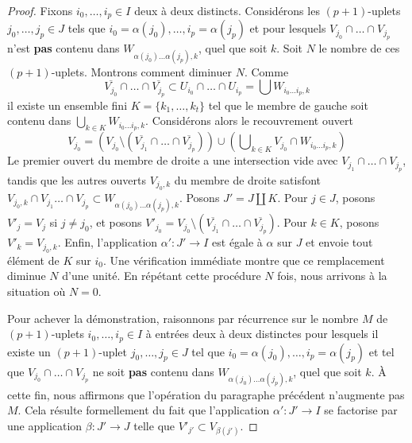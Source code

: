\begin{proof}
\medskip\noindent
Fixons $i_0, \ldots, i_p \in I$ deux à deux distincts. Considérons les
$(p + 1)$-uplets $j_0, \ldots, j_p \in J$ tels que
$i_0 = \alpha(j_0), \ldots, i_p = \alpha(j_p)$ et pour lesquels
$V_{j_0} \cap \ldots \cap V_{j_p}$ n'est {\bf pas} contenu dans
$W_{\alpha(j_0) \ldots \alpha(j_p), k}$, quel que soit $k$.
Soit $N$ le nombre de ces $(p + 1)$-uplets. Montrons comment diminuer $N$.
Comme
$$
\overline{V_{j_0}} \cap \ldots \cap \overline{V_{j_p}} \subset
U_{i_0} \cap \ldots \cap U_{i_p} = \bigcup W_{i_0 \ldots i_p, k}
$$
il existe un ensemble fini $K = \{k_1, \ldots, k_t\}$ tel que le membre de
gauche soit contenu dans $\bigcup_{k \in K} W_{i_0 \ldots i_p, k}$.
Considérons alors le recouvrement ouvert
$$
V_{j_0} =
(V_{j_0} \setminus (\overline{V_{j_1}} \cap \ldots \cap \overline{V_{j_p}}))
\cup (\bigcup\nolimits_{k \in K} V_{j_0} \cap W_{i_0 \ldots i_p, k})
$$
Le premier ouvert du membre de droite a une intersection vide avec
$V_{j_1} \cap \ldots \cap V_{j_p}$, tandis que les
autres ouverts $V_{j_0, k}$ du membre de droite satisfont
$V_{j_0, k} \cap V_{j_1} \ldots \cap V_{j_p} \subset
W_{\alpha(j_0) \ldots \alpha(j_p), k}$.
Posons $J' = J \amalg K$. Pour $j \in J$, posons $V'_j = V_j$ si
$j \not = j_0$, et posons
$V'_{j_0} =
V_{j_0} \setminus (\overline{V_{j_1}} \cap \ldots \cap \overline{V_{j_p}})$.
Pour $k \in K$, posons $V'_k = V_{j_0, k}$. Enfin, l'application
$\alpha' : J' \to I$ est égale à $\alpha$ sur $J$ et envoie tout élément de
$K$ sur $i_0$. Une vérification immédiate montre que ce remplacement diminue
$N$ d'une unité. En répétant cette procédure $N$ fois, nous arrivons à la
situation où $N = 0$.

\medskip\noindent
Pour achever la démonstration, raisonnons par récurrence sur le nombre $M$ de
$(p + 1)$-uplets $i_0, \ldots, i_p \in I$ à entrées deux à deux distinctes
pour lesquels il existe un $(p + 1)$-uplet $j_0, \ldots, j_p \in J$ tel que
$i_0 = \alpha(j_0), \ldots, i_p = \alpha(j_p)$ et tel que
$V_{j_0} \cap \ldots \cap V_{j_p}$ ne soit {\bf pas} contenu dans
$W_{\alpha(j_0) \ldots \alpha(j_p), k}$, quel que soit $k$. À cette fin, nous
affirmons que l'opération du paragraphe précédent n'augmente pas $M$.
Cela résulte formellement du fait que l'application $\alpha' : J' \to I$ se
factorise par une application $\beta : J' \to J$ telle que
$V'_{j'} \subset V_{\beta(j')}$.
\end{proof}

